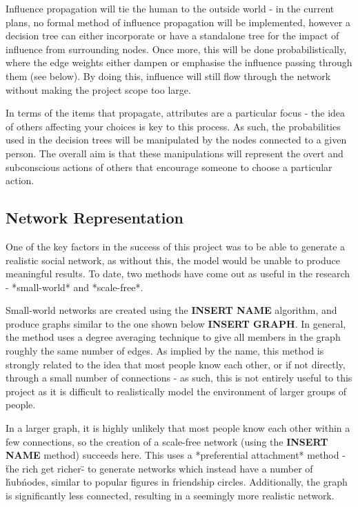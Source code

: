 \documentclass[]{article}
\begin{document}
Influence propagation will tie the human to the outside world - in the current plans, no formal method of influence propagation will be implemented, however a decision tree can either incorporate or have a standalone tree for the impact of influence from surrounding nodes. Once more, this will be done probabilistically, where the edge weights either dampen or emphasise the influence passing through them (see below). By doing this, influence will still flow through the network without making the project scope too large.

In terms of the items that propagate, attributes are a particular focus - the idea of others affecting your choices is key to this process. As such, the probabilities used in the decision trees will be manipulated by the nodes connected to a given person. The overall aim is that these manipulations will represent the overt and subconscious actions of others that encourage someone to choose a particular action.

\subsection{Network Representation}
One of the key factors in the success of this project was to be able to generate a realistic social network, as without this, the model would be unable to produce meaningful results. To date, two methods have come out as useful in the research - *small-world* and *scale-free*.

Small-world networks are created using the {\bf INSERT NAME} algorithm, and produce graphs similar to the one shown below {\bf INSERT GRAPH}. In general, the method uses a degree averaging technique to give all members in the graph roughly the same number of edges. As implied by the name, this method is strongly related to the idea that most people know each other, or if not directly, through a small number of connections - as such, this is not entirely useful to this project as it is difficult to realistically model the environment of larger groups of people. 

In a larger graph, it is highly unlikely that most people know each other within a few connections, so the creation of a scale-free network (using the {\bf INSERT NAME} method) succeeds here. This uses a *preferential attachment* method - \"the rich get richer\" - to generate networks which instead have a number of \'hub\' nodes, similar to popular figures in friendship circles. Additionally, the graph is significantly less connected, resulting in a seemingly more realistic network.
\end{document}
